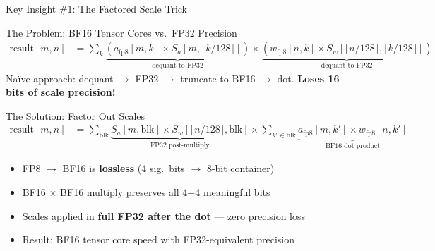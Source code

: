 \documentclass[aspectratio=169,11pt]{beamer}
\begin{document}
\begin{frame}[t]{Key Insight \#1: The Factored Scale Trick}
\footnotesize

\begin{block}{The Problem: BF16 Tensor Cores vs.\ FP32 Precision}
\vspace{-0.2cm}
\begin{align*}
\text{result}[m,n] &= \sum_k \underbrace{\left(a_{\text{fp8}}[m,k] \times S_a[m, \lfloor k/128\rfloor]\right)}_{\text{dequant to FP32}} 
    \times \underbrace{\left(w_{\text{fp8}}[n,k] \times S_w[\lfloor n/128\rfloor, \lfloor k/128\rfloor]\right)}_{\text{dequant to FP32}}
\end{align*}
\vspace{-0.2cm}
Na\"ive approach: dequant $\to$ FP32 $\to$ truncate to BF16 $\to$ dot. 
\textcolor{deepred}{\textbf{Loses 16 bits of scale precision!}}
\end{block}

\begin{exampleblock}{The Solution: Factor Out Scales}
\vspace{-0.2cm}
\begin{align*}
\text{result}[m,n] &= \sum_{\text{blk}} 
    \underbrace{S_a[m, \text{blk}] \times S_w[\lfloor n/128\rfloor, \text{blk}]}_{\text{FP32 post-multiply}} 
    \times \sum_{k' \in \text{blk}} 
    \underbrace{a_{\text{fp8}}[m,k'] \times w_{\text{fp8}}[n,k']}_{\text{BF16 dot product}}
\end{align*}
\vspace{-0.2cm}
\begin{itemize}
    \item FP8 $\to$ BF16 is \textbf{lossless} (4 sig.\ bits $\to$ 8-bit container)
    \item BF16 $\times$ BF16 multiply preserves all 4+4 meaningful bits
    \item Scales applied in \textbf{full FP32 after the dot} --- zero precision loss
    \item Result: BF16 tensor core speed with FP32-equivalent precision
\end{itemize}
\end{exampleblock}
\end{frame}
\end{document}
